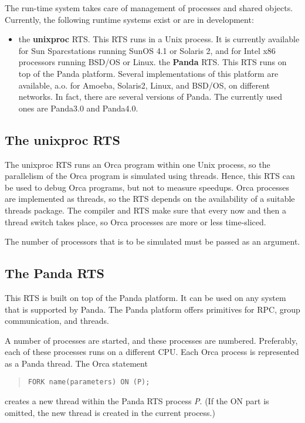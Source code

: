 \documentclass[10pt]{article}
\begin{document}
The run-time system takes care of management of processes and shared objects.
Currently, the following runtime systems exist or are in development:
\begin{itemize}
\item
the {\bf unixproc} RTS. This RTS runs in a Unix process.
It is currently available for Sun Sparcstations running SunOS 4.1 or Solaris 2,
and for Intel x86 processors running BSD/OS or Linux.
the {\bf Panda}
RTS. This RTS runs on top of the Panda platform. Several implementations of
this platform are available, a.o. for Amoeba, Solaris2, Linux, and BSD/OS,
on different networks.
In fact, there are several versions of Panda. The currently used ones are
Panda3.0 and Panda4.0.
\end{itemize}

\subsection{The unixproc RTS}

The unixproc RTS runs an Orca program within one Unix process, so
the parallelism of the Orca program is simulated using threads.
Hence, this RTS can be used to debug Orca programs, but not to measure
speedups.
Orca processes are implemented as threads, so the RTS depends on the
availability of a suitable threads package.
The compiler and RTS make sure that every now and then a thread switch takes
place, so Orca processes are more or less time-sliced.

The number of processors that is to be simulated must be passed as an argument.

\subsection{The Panda RTS}

This RTS is built on top of the Panda platform. It can be
used on any system that is supported by Panda. The Panda platform offers
primitives for RPC, group communication, and threads.

A number of processes are started, and these processes
are numbered. Preferably, each of these processes runs on a different CPU.
Each Orca process is represented as a Panda thread.
The Orca statement
\begin{quote}
\begin{verbatim}
FORK name(parameters) ON (P);
\end{verbatim}
\end{quote}
creates a new thread within the Panda RTS process
{\em P}.
(If the ON part is omitted, the new thread is created in the current process.)
\end{document}
